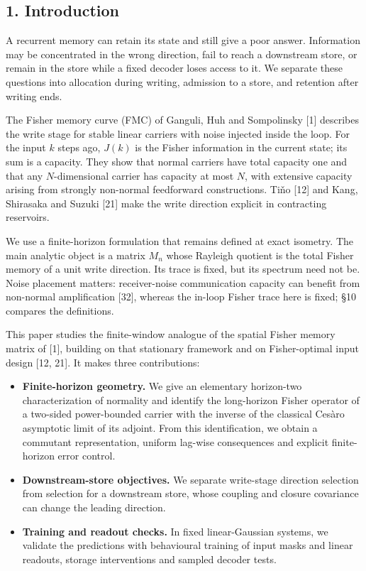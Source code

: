 \documentclass[
  10pt,
]{article}
\providecommand{\tightlist}{%
  \setlength{\itemsep}{0pt}\setlength{\parskip}{0pt}}
\begin{document}
\subsection{1. Introduction}\label{introduction}

A recurrent memory can retain its state and still give a poor answer.
Information may be concentrated in the wrong direction, fail to reach a
downstream store, or remain in the store while a fixed decoder loses
access to it. We separate these questions into allocation during
writing, admission to a store, and retention after writing ends.

The Fisher memory curve (FMC) of Ganguli, Huh and Sompolinsky {[}1{]}
describes the write stage for stable linear carriers with noise injected
inside the loop. For the input \(k\) steps ago, \(J(k)\) is the Fisher
information in the current state; its sum is a capacity. They show that
normal carriers have total capacity one and that any \(N\)-dimensional
carrier has capacity at most \(N\), with extensive capacity arising from
strongly non-normal feedforward constructions. Tiňo {[}12{]} and Kang,
Shirasaka and Suzuki {[}21{]} make the write direction explicit in
contracting reservoirs.

We use a finite-horizon formulation that remains defined at exact
isometry. The main analytic object is a matrix \(M_n\) whose Rayleigh
quotient is the total Fisher memory of a unit write direction. Its trace
is fixed, but its spectrum need not be. Noise placement matters:
receiver-noise communication capacity can benefit from non-normal
amplification {[}32{]}, whereas the in-loop Fisher trace here is fixed;
§10 compares the definitions.

This paper studies the finite-window analogue of the spatial Fisher
memory matrix of {[}1{]}, building on that stationary framework and on
Fisher-optimal input design {[}12, 21{]}. It makes three contributions:

\begin{itemize}
\tightlist
\item
  \textbf{Finite-horizon geometry.} We give an elementary horizon-two
  characterization of normality and identify the long-horizon Fisher
  operator of a two-sided power-bounded carrier with the inverse of the
  classical Cesàro asymptotic limit of its adjoint. From this
  identification, we obtain a commutant representation, uniform lag-wise
  consequences and explicit finite-horizon error control.
\item
  \textbf{Downstream-store objectives.} We separate write-stage
  direction selection from selection for a downstream store, whose
  coupling and closure covariance can change the leading direction.
\item
  \textbf{Training and readout checks.} In fixed linear-Gaussian
  systems, we validate the predictions with behavioural training of
  input masks and linear readouts, storage interventions and sampled
  decoder tests.
\end{itemize}
\end{document}
